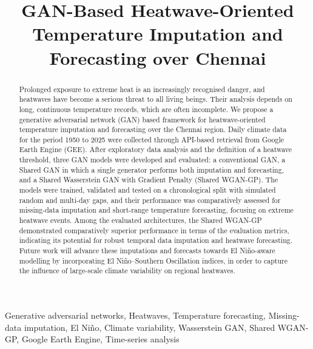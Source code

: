 \documentclass[conference,a4paper]{IEEEtran}
\begin{document}
\title{GAN-Based Heatwave-Oriented Temperature Imputation and Forecasting over Chennai}

\author{
}

\maketitle

\begin{abstract}
Prolonged exposure to extreme heat is an increasingly recognised danger, and heatwaves have become a serious threat to all living beings. Their analysis depends on long, continuous temperature records, which are often incomplete. We propose a generative adversarial network (GAN) based framework for heatwave-oriented temperature imputation and forecasting over the Chennai region. Daily climate data for the period 1950 to 2025 were collected through API-based retrieval from Google Earth Engine (GEE). After exploratory data analysis and the definition of a heatwave threshold, three GAN models were developed and evaluated: a conventional GAN, a Shared GAN in which a single generator performs both imputation and forecasting, and a Shared Wasserstein GAN with Gradient Penalty (Shared WGAN-GP). The models were trained, validated and tested on a chronological split with simulated random and multi-day gaps, and their performance was comparatively assessed for missing-data imputation and short-range temperature forecasting, focusing on extreme heatwave events. Among the evaluated architectures, the Shared WGAN-GP demonstrated comparatively superior performance in terms of the evaluation metrics, indicating its potential for robust temporal data imputation and heatwave forecasting. Future work will advance these imputations and forecasts towards El Ni\~no-aware modelling by incorporating El Ni\~no--Southern Oscillation indices, in order to capture the influence of large-scale climate variability on regional heatwaves.
\end{abstract}

\begin{IEEEkeywords}
Generative adversarial networks, Heatwaves, Temperature forecasting, Missing-data imputation, El Ni\~no, Climate variability, Wasserstein GAN, Shared WGAN-GP, Google Earth Engine, Time-series analysis
\end{IEEEkeywords}
\end{document}
